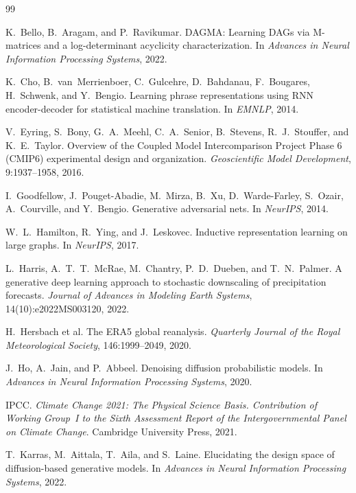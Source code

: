 \begin{thebibliography}{99}

 K.~Bello, B.~Aragam, and P.~Ravikumar. DAGMA: Learning DAGs via M-matrices and a log-determinant acyclicity characterization. In \emph{Advances in Neural Information Processing Systems}, 2022.

 K.~Cho, B.~van~Merrienboer, C.~Gulcehre, D.~Bahdanau, F.~Bougares, H.~Schwenk, and Y.~Bengio. Learning phrase representations using RNN encoder-decoder for statistical machine translation. In \emph{EMNLP}, 2014.

 V.~Eyring, S.~Bony, G.~A.~Meehl, C.~A.~Senior, B.~Stevens, R.~J.~Stouffer, and K.~E.~Taylor. Overview of the Coupled Model Intercomparison Project Phase 6 (CMIP6) experimental design and organization. \emph{Geoscientific Model Development}, 9:1937--1958, 2016.

 I.~Goodfellow, J.~Pouget-Abadie, M.~Mirza, B.~Xu, D.~Warde-Farley, S.~Ozair, A.~Courville, and Y.~Bengio. Generative adversarial nets. In \emph{NeurIPS}, 2014.

 W.~L.~Hamilton, R.~Ying, and J.~Leskovec. Inductive representation learning on large graphs. In \emph{NeurIPS}, 2017.

 L.~Harris, A.~T.~T.~McRae, M.~Chantry, P.~D.~Dueben, and T.~N.~Palmer. A generative deep learning approach to stochastic downscaling of precipitation forecasts. \emph{Journal of Advances in Modeling Earth Systems}, 14(10):e2022MS003120, 2022.

 H.~Hersbach et al. The ERA5 global reanalysis. \emph{Quarterly Journal of the Royal Meteorological Society}, 146:1999--2049, 2020.

 J.~Ho, A.~Jain, and P.~Abbeel. Denoising diffusion probabilistic models. In \emph{Advances in Neural Information Processing Systems}, 2020.

 IPCC. \emph{Climate Change 2021: The Physical Science Basis. Contribution of Working Group~I to the Sixth Assessment Report of the Intergovernmental Panel on Climate Change}. Cambridge University Press, 2021.

 T.~Karras, M.~Aittala, T.~Aila, and S.~Laine. Elucidating the design space of diffusion-based generative models. In \emph{Advances in Neural Information Processing Systems}, 2022.


\end{thebibliography}
